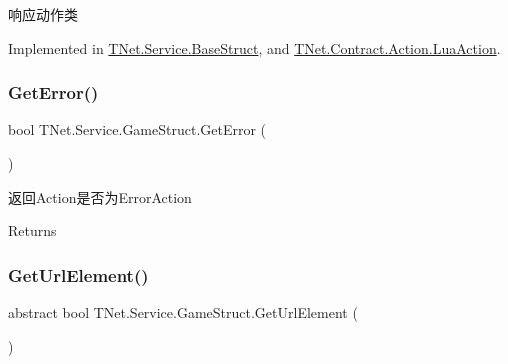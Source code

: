 响应动作类 



Implemented in \mbox{\hyperlink{class_t_net_1_1_service_1_1_base_struct_ad55cbb354a9de58eb1c2d0608a7e21f2}{T\+Net.\+Service.\+Base\+Struct}}, and \mbox{\hyperlink{class_t_net_1_1_contract_1_1_action_1_1_lua_action_a78a9480dd9ac68c156592326ac5e04bf}{T\+Net.\+Contract.\+Action.\+Lua\+Action}}.

\mbox{\label{class_t_net_1_1_service_1_1_game_struct_ad91c83aa507d6d20fb3bd2898a2f68aa}} 
\subsubsection{\texorpdfstring{Get\+Error()}{GetError()}}
{\footnotesize\ttfamily bool T\+Net.\+Service.\+Game\+Struct.\+Get\+Error (\begin{DoxyParamCaption}{ }\end{DoxyParamCaption})}



返回\+Action是否为\+Error\+Action 

\begin{DoxyReturn}{Returns}

\end{DoxyReturn}
\mbox{\label{class_t_net_1_1_service_1_1_game_struct_ad4167cb7ce62183a1336ebc30a848bfc}} 
\subsubsection{\texorpdfstring{Get\+Url\+Element()}{GetUrlElement()}}
{\footnotesize\ttfamily abstract bool T\+Net.\+Service.\+Game\+Struct.\+Get\+Url\+Element (\begin{DoxyParamCaption}{ }\end{DoxyParamCaption})\hspace{0.3cm}{\ttfamily [pure virtual]}}



